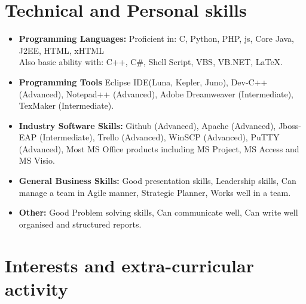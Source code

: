 \documentclass[11pt,a4paper,sans]{moderncv}        %
\begin{document}
\section{Technical and Personal skills}

\vspace{6pt}

\begin{itemize}

\item \textbf{Programming Languages:} Proficient in: C, Python, PHP, js, Core Java, J2EE, HTML, xHTML \\ Also basic ability with: C++, C\#, Shell Script, VBS, VB.NET, LaTeX.

\vspace{6pt}

\item \textbf{Programming Tools} Eclipse IDE(Luna, Kepler, Juno), Dev-C++ (Advanced), Notepad++ (Advanced), Adobe Dreamweaver (Intermediate),  TexMaker (Intermediate).

\vspace{6pt}

\item \textbf{Industry Software Skills:} Github (Advanced), Apache (Advanced), Jboss-EAP (Intermediate), Trello (Advanced), WinSCP (Advanced), PuTTY (Advanced), Most MS Office products including MS Project, MS Access and MS Visio.

\vspace{6pt}

\item \textbf{General Business Skills:} Good presentation skills, Leadership skills, Can manage a team in Agile manner, Strategic Planner, Works well in a team.

\vspace{6pt}

\item \textbf{Other:} Good Problem solving skills, Can communicate well, Can write well organised and structured reports.

\end{itemize}

\section{Interests and extra-curricular activity}

\vspace{6pt}
\end{document}
